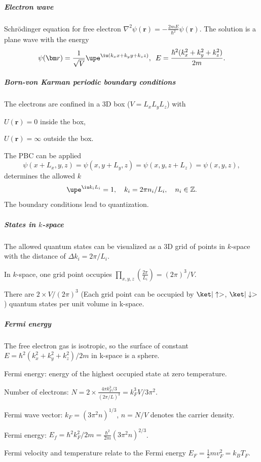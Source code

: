 \subparagraph{Electron wave}\leavevmode

Schr\"odinger equation for free electron
$\nabla^2\psi(\bm r) = -\frac{2mE}{\hbar^2}\psi(\bm r)$.
The solution is a plane wave with the energy
\[
  \psi(\bm r) = \frac1{\sqrt V} \upe^{\iu(k_xx + k_yy + k_zz)},\enspace
  E = \frac{\hbar^2(k_x^2 + k_y^2 + k_z^2)}{2m}.
\]

\subparagraph{Born-von Karman periodic boundary conditions}\leavevmode

The electrons are confined in a 3D box ($V = L_xL_yL_z$) with
\begin{enumext}[columns = 2]
  \item $U(\bm r) = 0$ inside the box,
  \item $U(\bm r) = \infty$ outside the box.
\end{enumext}
The PBC can be applied
\[
  \psi(x + L_x, y, z) = \psi(x, y + L_y, z) = \psi(x, y, z + L_z)
= \psi(x, y, z),
\]
determines the allowed $k$
\[
  \upe^{\iu k_iL_i} = 1,\quad k_i = 2\pi n_i/L_i, \quad n_i \in \mathbb Z.
\]
The boundary conditions lead to quantization.

\subparagraph{States in $k$-space}

\begin{enumext}
  \item The allowed quantum states can be visualized as a 3D grid of points in
  $k$-space with the distance of $\Delta k_i = 2\pi/L_i$.
  \item In $k$-space, one grid point occupies
  $\prod_{x,y,z}(\frac{2\pi}{L_i}) = (2\pi)^3/V$.
  \item There are $2 \times V/(2\pi)^3$ (Each grid point can be occupied
  by $\ket|\uparrow>$, $\ket|\downarrow>$) quantum states per unit
  volume in k-space.
\end{enumext}

\subparagraph{Fermi energy}

\begin{enumext}
  \item The free electron gas is isotropic, so the surface of constant
  $E = \hbar^2(k_x^2 + k_y^2 + k_z^2)/2m$ in k-space is a sphere.
  \item Fermi energy: energy of the highest occupied state at zero temperature.
  \begin{enumext}
    \item Number of
    electrons: $N = 2 \times \frac{4\pi k_F^3/3}{(2\pi/L)^3} = k_F^3V/3\pi^2$.
    \item Fermi wave vector: $k_F = (3\pi^2n)^{1/3}$, $n = N/V$ denotes the
    carrier density.
    \item Fermi
    energy: $E_f = \hbar^2k_F^2/2m = \frac{\hbar^2}{2m}(3\pi^2n)^{2/3}$.
    \item Fermi velocity and temperature relate to the Fermi
    energy $E_F = \frac12mv_F^2 = k_BT_F$.
  \end{enumext}
\end{enumext}

